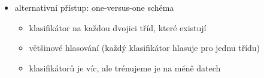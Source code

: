 \begin{itemize}
\begin{itemize}
\begin{itemize}
\item natrénuju $K$ nezávislých binárních klasifikátorů (patří prvek konkrétní třídě? ano/ne)
\item při predikci vyberu třídu, které její klasifikátor přisuzuje největší pravděpodobnost
\item je potřeba klasifikátory kalibrovat, aby se ty pravděpodobnosti daly porovnávat!
\item takhle se to u SVM nedělá
\end{itemize}
\item alternativní přístup: one-versus-one schéma
\begin{itemize}
\item klasifikátor na každou dvojici tříd, které existují
\item většinové hlasování (každý klasifikátor hlasuje pro jednu třídu)
\item klasifikátorů je víc, ale trénujeme je na méně datech
\end{itemize}
\end{itemize}
\end{itemize}
